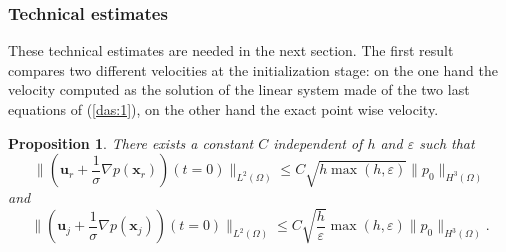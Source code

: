 \documentclass[a4paper,french,english,10pt]{article}
\newcommand\uu{\mathbf{u}}
\newcommand\eps{\varepsilon}
\newcommand\x{\mathbf{x}}
\newtheorem{pro}[theorem]{Proposition}
\begin{document}
\subsubsection{Technical estimates}

These technical estimates are  needed in the next section.
The first result compares two different velocities  at the initialization stage:   
on the one hand  the velocity   computed as the solution of  the linear system
made of the two last equations of (\ref{das:1}), on the other hand  the exact point wise
velocity.  

\begin{pro}\label{esti_initial_data}
There exists a constant $C$ independent of $h$ and $\varepsilon$
such that
\begin{equation} \label{eq:iner1}
\bigg\| \left(  \uu_r +\frac1\sigma \nabla p(\x _r)\right)(t=0)\bigg\|_
{ L^2(\Omega) }\leq C \sqrt {h\max( h, \eps )} \| p_0 \|_{H^3(\Omega)}
\end{equation}
and
\begin{equation} \label{eq:iner10}
\bigg\| \left(  \uu_j +\frac1\sigma \nabla p(\x _j)\right)(t=0)\bigg\|_
{ L^2(\Omega) }\leq C  
 \sqrt{ \frac{h}\eps} \max(  h, \eps)\| p_0 \|_{H^3(\Omega)}.  
\end{equation}
\end{pro}
\end{document}
